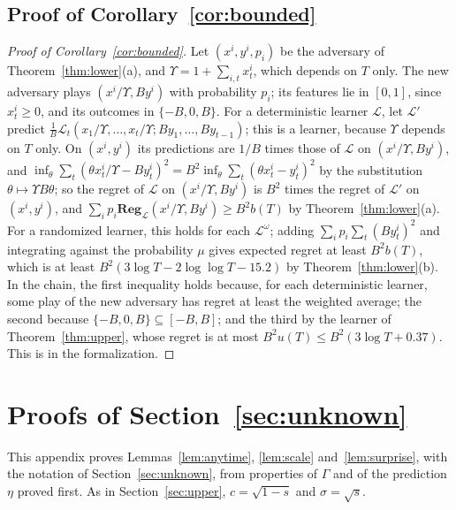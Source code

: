 \documentclass[12pt]{amsart}
\theoremstyle{definition}
\numberwithin{equation}{section}
\newcommand{\Reg}{\mathbf{Reg}}
\begin{document}
\subsection{Proof of Corollary~\ref{cor:bounded}}

\begin{proof}[Proof of Corollary~\ref{cor:bounded}]
Let $(x^i,y^i,p_i)$ be the adversary of Theorem~\ref{thm:lower}(a), and $\Upsilon=1+\sum_{i,t}x^i_t$, which depends on $T$ only. The new adversary plays $(x^i/\Upsilon,By^i)$ with probability $p_i$; its features lie in $[0,1]$, since $x^i_t\ge0$, and its outcomes in $\{-B,0,B\}$. For a deterministic learner $\mathcal L$, let $\mathcal L'$ predict $\frac1B\mathcal L_t(x_1/\Upsilon,\dots,x_t/\Upsilon;By_1,\dots,By_{t-1})$; this is a learner, because $\Upsilon$ depends on $T$ only. On $(x^i,y^i)$ its predictions are $1/B$ times those of $\mathcal L$ on $(x^i/\Upsilon,By^i)$, and $\inf_\theta\sum_t(\theta x^i_t/\Upsilon-By^i_t)^2=B^2\inf_\theta\sum_t(\theta x^i_t-y^i_t)^2$ by the substitution $\theta\mapsto \Upsilon B\theta$; so the regret of $\mathcal L$ on $(x^i/\Upsilon,By^i)$ is $B^2$ times the regret of $\mathcal L'$ on $(x^i,y^i)$, and $\sum_ip_i\Reg_{\mathcal L}(x^i/\Upsilon,By^i)\ge B^2b(T)$ by Theorem~\ref{thm:lower}(a). For a randomized learner, this holds for each $\mathcal L^\omega$; adding $\sum_ip_i\sum_t(By^i_t)^2$ and integrating against the probability $\mu$ gives expected regret at least $B^2b(T)$, which is at least $B^2(3\log T-2\log\log T-15.2)$ by Theorem~\ref{thm:lower}(b). In the chain, the first inequality holds because, for each deterministic learner, some play of the new adversary has regret at least the weighted average; the second because $\{-B,0,B\}\subseteq[-B,B]$; and the third by the learner of Theorem~\ref{thm:upper}, whose regret is at most $B^2u(T)\le B^2(3\log T+0.37)$. This is  in the formalization.
\end{proof}

\section{Proofs of Section~\ref{sec:unknown}}\label{app:unknown}

This appendix proves Lemmas~\ref{lem:anytime}, \ref{lem:scale} and~\ref{lem:surprise}, with the notation of Section~\ref{sec:unknown}, from properties of $\Gamma$ and of the prediction $\eta$ proved first. As in Section~\ref{sec:upper}, $c=\sqrt{1-s}$ and $\sigma=\sqrt s$.
\end{document}
